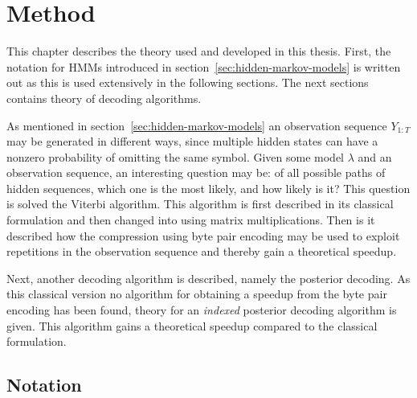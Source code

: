 \chapter{Method}
\label{cha:method}

This chapter describes the theory used and developed in this thesis. First, the
notation for HMMs introduced in section~\ref{sec:hidden-markov-models} is
written out as this is used extensively in the following sections. The next
sections contains theory of decoding algorithms.

As mentioned in section~\ref{sec:hidden-markov-models} an observation sequence
$Y_{1:T}$ may be generated in different ways, since multiple hidden states can
have a nonzero probability of omitting the same symbol. Given some model
$\lambda$ and an observation sequence, an interesting question may be: of all
possible paths of hidden sequences, which one is the most likely, and how likely
is it? This question is solved the Viterbi algorithm. This algorithm is first
described in its classical formulation and then changed into using matrix
multiplications. Then is it described how the compression using byte pair
encoding may be used to exploit repetitions in the observation sequence and
thereby gain a theoretical speedup.

Next, another decoding algorithm is described, namely the posterior decoding.
As this classical version no algorithm for obtaining a speedup from the byte
pair encoding has been found, theory for an \emph{indexed} posterior decoding
algorithm is given. This algorithm gains a theoretical speedup compared to the
classical formulation.

\section{Notation}

